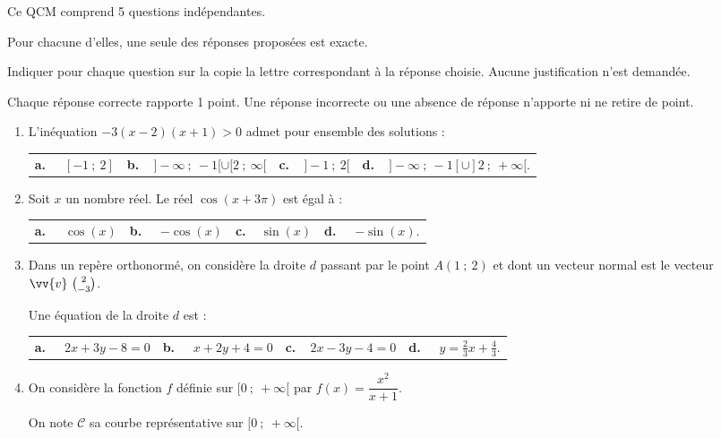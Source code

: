 \medskip

Ce QCM comprend 5 questions indépendantes. 

Pour chacune d'elles, une seule des réponses proposées est exacte.

Indiquer pour chaque question sur la copie la lettre correspondant à la réponse choisie. Aucune justification n'est demandée.

Chaque réponse correcte rapporte 1 point. Une réponse incorrecte ou une absence de réponse n'apporte ni ne retire de point.

\medskip

\begin{enumerate}
\item  L'inéquation $-3(x-2)(x+1)>0$ admet pour ensemble des solutions :

\medskip

\begin{tabularx}{1.05\linewidth}{*{4}{X}}
\textbf{a.~~} $[-1~;~2] $ &\textbf{b.~~}\small $]-\infty~;~-1[\cup[2~;~\infty[ $&\textbf{c.~~}$]-1~;~2[ $& \textbf{d.~~}\small $ ]-\infty~;~-1[\cup]2~;~+\infty[ $.
\end{tabularx}

\item Soit $x$ un nombre réel. Le réel $\cos(x+3\pi)$ est égal à :

\medskip

\begin{tabularx}{1.05\linewidth}{*{4}{X}}
\textbf{a.~~} $\cos(x) $ &\textbf{b.~~} $-\cos(x) $&\textbf{c.~~}$\sin(x) $& \textbf{d.~~} $-\sin (x)  $.
\end{tabularx}

\item  Dans un repère orthonormé, on considère la droite $d$ passant par le point $A(1~;~2)$ et dont un vecteur normal est le vecteur $\vv{v}\ \binom{2}{-3}$. 

Une équation de la droite $d$ est :

\medskip

\begin{tabularx}{1.05\linewidth}{*{4}{X}}
\textbf{a.~~} $2x+3y-8=0 $ &\textbf{b.~~} $ x+2y+4=0 $&\textbf{c.~~}$ 2x-3y-4=0$& \textbf{d.~~} $y=\frac{2}{3}x+\frac{4}{3}  $.
\end{tabularx}

\item On considère la fonction $f$ définie sur $[0~;~+\infty[$ par $f(x)=\dfrac{x^2}{x+1}$.

On note $\mathscr{C}$ sa courbe représentative sur $[0~;~+\infty[$.


\end{enumerate}
